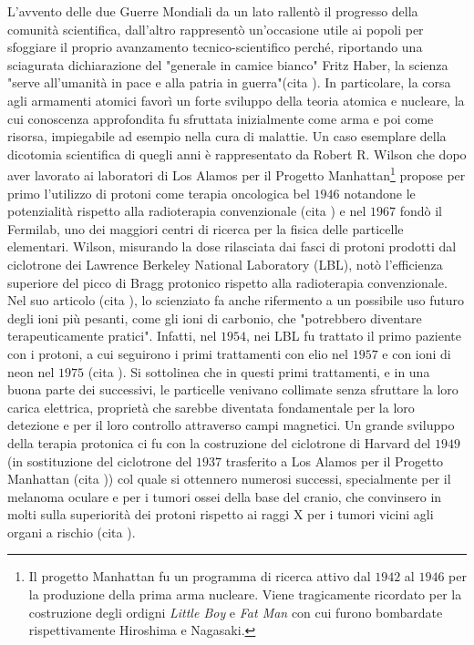 \documentclass[12pt,a4paper,twoside]{report}
\begin{document}
	L'avvento delle due Guerre Mondiali da un lato rallentò il progresso della comunità scientifica, dall'altro rappresentò un'occasione utile ai popoli per sfoggiare il proprio avanzamento tecnico-scientifico perché, riportando una sciagurata dichiarazione del "generale in camice bianco" Fritz Haber, la scienza "serve all’umanità in pace e alla patria in guerra"(cita
	). In particolare, la corsa agli armamenti atomici favorì un forte sviluppo della teoria atomica e nucleare, la cui conoscenza approfondita fu sfruttata inizialmente come arma e poi come risorsa, impiegabile ad esempio nella cura di malattie. Un caso esemplare della dicotomia scientifica di quegli anni è rappresentato da Robert R. Wilson che dopo aver lavorato ai laboratori di Los Alamos per il Progetto Manhattan\footnote{Il progetto Manhattan fu un programma di ricerca attivo dal $1942$ al $1946$ per la produzione della prima arma nucleare. Viene tragicamente ricordato per la costruzione degli ordigni \textit{Little Boy} e \textit{Fat Man} con cui furono bombardate rispettivamente Hiroshima e Nagasaki.} propose per primo l'utilizzo di protoni come terapia oncologica bel $1946$ notandone le potenzialità rispetto alla radioterapia convenzionale (cita
	) e nel $1967$ fondò il Fermilab, uno dei maggiori centri di ricerca per la fisica delle particelle elementari. Wilson, misurando la dose rilasciata dai fasci di protoni prodotti dal ciclotrone dei Lawrence Berkeley National Laboratory (LBL), notò l'efficienza superiore del picco di Bragg protonico rispetto alla radioterapia convenzionale. Nel suo articolo (cita
	), lo scienziato fa anche rifermento a un possibile uso futuro degli ioni più pesanti, come gli ioni di carbonio, che "potrebbero diventare terapeuticamente pratici". Infatti, nel $1954$, nei LBL fu trattato il primo paziente con i protoni, a cui seguirono i primi trattamenti con elio nel $1957$ e con ioni di neon nel $1975$ (cita
	). Si sottolinea che in questi primi trattamenti, e in una buona parte dei successivi, le particelle venivano collimate senza sfruttare la loro carica elettrica, proprietà che sarebbe diventata fondamentale per la loro detezione e per il loro controllo attraverso campi magnetici. Un grande sviluppo della terapia protonica ci fu con la costruzione del ciclotrone di Harvard del $1949$ (in sostituzione del ciclotrone del $1937$ trasferito a Los Alamos per il Progetto Manhattan (cita
	)) col quale si ottennero numerosi successi, specialmente per il melanoma oculare e per i tumori ossei della base del cranio, che convinsero in molti sulla superiorità dei protoni rispetto ai raggi X per i tumori vicini agli organi a rischio (cita
	).
	
\end{document}

